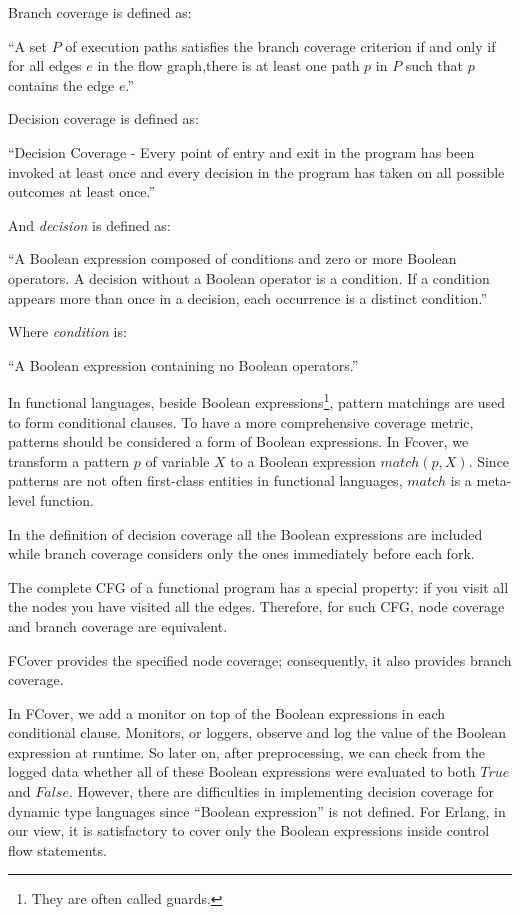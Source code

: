 \documentclass[12pt,a4paper]{report}
\begin{document}
Branch coverage is defined as:

``A set $P$ of execution paths satisfies the branch coverage criterion if and only if for all edges $e$ in the flow graph,there is at least one path $p$ in $P$ such that $p$ contains the edge $e$.''\cite{Zhu:1997:SUT:267580.267590}

Decision coverage is defined as:

``Decision Coverage - Every point of entry and exit in the program has been invoked at least once and every decision in the program has taken on all possible outcomes at least once.''\cite{cast-10}

And \emph{decision} is defined as:

``A Boolean expression composed of conditions and zero or more Boolean operators. A decision without a Boolean operator is a condition. If a condition appears more than once in a decision, each occurrence is a distinct condition.''\cite{cast-10}

Where \emph{condition} is:

``A Boolean expression containing no Boolean operators.''\cite{cast-10}

In functional languages, beside Boolean expressions\footnote{They are often called guards.}, pattern matchings are used to form conditional clauses. To have a more comprehensive coverage metric, patterns should be considered a form of Boolean expressions. In Fcover, we transform a pattern $p$ of variable $X$ to a Boolean expression $match(p,X)$. Since patterns are not often first-class entities in functional languages, $match$ is a meta-level function.

In the definition of decision coverage all the Boolean expressions are included while branch coverage considers only the ones immediately before each fork.

The complete CFG of a functional program has a special property: if you visit all the nodes you have visited all the edges. Therefore, for such CFG, node coverage and branch coverage are equivalent. 

FCover provides the specified node coverage; consequently, it also provides branch coverage.

In FCover, we add a monitor on top of the Boolean expressions in each conditional clause. Monitors, or loggers, observe and log the value of the Boolean expression at runtime. So later on, after preprocessing, we can check from the logged data whether all of these Boolean expressions were evaluated to both $True$ and $False$. However, there are difficulties in implementing decision coverage for dynamic type languages since ``Boolean expression'' is not defined. For Erlang, in our view, it is satisfactory to cover only the Boolean expressions inside control flow statements.
\end{document}
